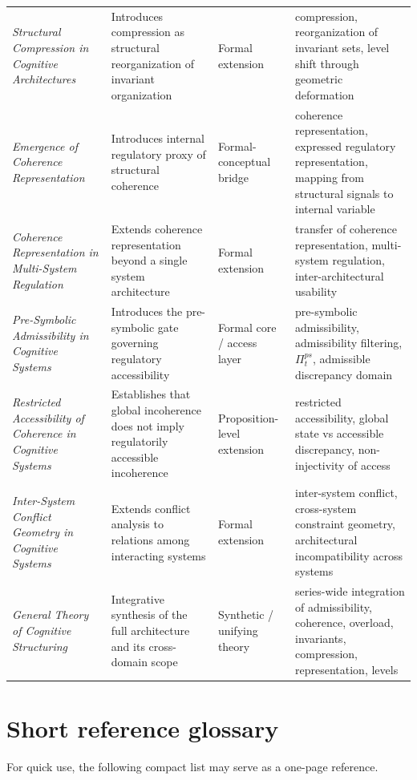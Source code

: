 \documentclass[11pt,a4paper]{article}
\begin{document}
\begin{longtable}{>{\RaggedRight\arraybackslash}p{} >{\RaggedRight\arraybackslash}p{} >{\RaggedRight\arraybackslash}p{} >{\RaggedRight\arraybackslash}p{}}
		\emph{Structural Compression in Cognitive Architectures} & Introduces compression as structural reorganization of invariant organization & Formal extension & compression, reorganization of invariant sets, level shift through geometric deformation \\
		\emph{Emergence of Coherence Representation} & Introduces internal regulatory proxy of structural coherence & Formal-conceptual bridge & coherence representation, expressed regulatory representation, mapping from structural signals to internal variable \\
		\emph{Coherence Representation in Multi-System Regulation} & Extends coherence representation beyond a single system architecture & Formal extension & transfer of coherence representation, multi-system regulation, inter-architectural usability \\
		\emph{Pre-Symbolic Admissibility in Cognitive Systems} & Introduces the pre-symbolic gate governing regulatory accessibility & Formal core / access layer & pre-symbolic admissibility, admissibility filtering, $\Pi_t^{ps}$, admissible discrepancy domain \\
		\emph{Restricted Accessibility of Coherence in Cognitive Systems} & Establishes that global incoherence does not imply regulatorily accessible incoherence & Proposition-level extension & restricted accessibility, global state vs accessible discrepancy, non-injectivity of access \\
		\emph{Inter-System Conflict Geometry in Cognitive Systems} & Extends conflict analysis to relations among interacting systems & Formal extension & inter-system conflict, cross-system constraint geometry, architectural incompatibility across systems \\
		\emph{General Theory of Cognitive Structuring} & Integrative synthesis of the full architecture and its cross-domain scope & Synthetic / unifying theory & series-wide integration of admissibility, coherence, overload, invariants, compression, representation, levels \\
		\bottomrule
	\end{longtable}
	
	\newpage
	\section{Short reference glossary}
	
	For quick use, the following compact list may serve as a one-page reference.
	
\end{document}
